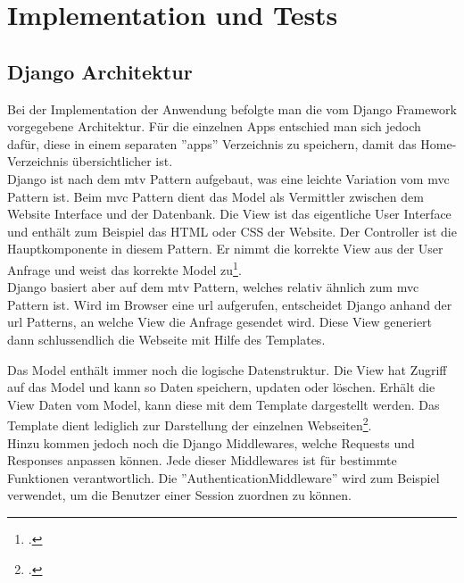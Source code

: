\section{Implementation und Tests}
\subsection{Django Architektur}
Bei der Implementation der Anwendung befolgte man die vom Django Framework vorgegebene Architektur. Für die einzelnen Apps entschied man sich jedoch dafür, diese in einem separaten ''apps'' Verzeichnis zu speichern, damit das Home-Verzeichnis übersichtlicher ist.\\

Django ist nach dem \gls{mtv} Pattern aufgebaut, was eine leichte Variation vom \gls{mvc} Pattern ist. Beim \gls{mvc} Pattern dient das Model als Vermittler zwischen dem Website Interface und der Datenbank. Die View ist das eigentliche User Interface und enthält zum Beispiel das HTML oder CSS der Website. Der Controller ist die Hauptkomponente in diesem Pattern. Er nimmt die korrekte View aus der User Anfrage und weist das korrekte Model zu\footcite{django_mvc}. \\

Django basiert aber auf dem \gls{mtv} Pattern, welches relativ ähnlich zum \gls{mvc} Pattern ist. Wird im Browser eine \gls{url} aufgerufen, entscheidet Django anhand der \gls{url} Patterns, an welche View die Anfrage gesendet wird. Diese View generiert dann schlussendlich die Webseite mit Hilfe des Templates.

Das Model enthält immer noch die logische Datenstruktur. Die View hat Zugriff auf das Model und kann so Daten speichern, updaten oder löschen. Erhält die View Daten vom Model, kann diese mit dem Template dargestellt werden. Das Template dient lediglich zur Darstellung der einzelnen Webseiten\footcite{django_mtv}. \\

Hinzu kommen jedoch noch die Django Middlewares, welche Requests und Responses anpassen können. Jede dieser Middlewares ist für bestimmte Funktionen verantwortlich. Die ''AuthenticationMiddleware'' wird zum Beispiel verwendet, um die Benutzer einer Session zuordnen zu können.

